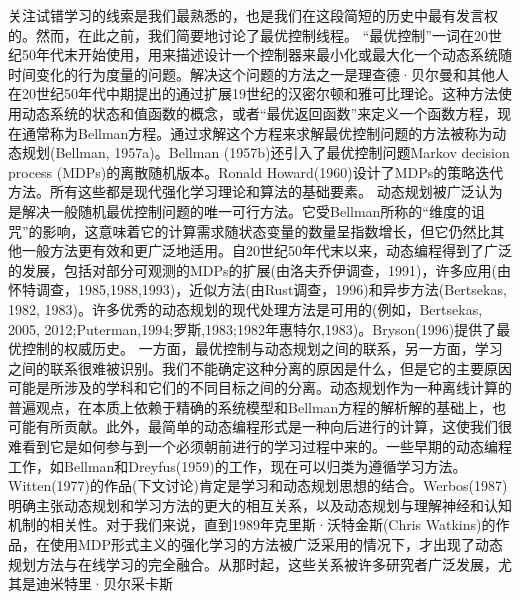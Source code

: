 关注试错学习的线索是我们最熟悉的，也是我们在这段简短的历史中最有发言权的。然而，在此之前，我们简要地讨论了最优控制线程。
“最优控制”一词在20世纪50年代末开始使用，用来描述设计一个控制器来最小化或最大化一个动态系统随时间变化的行为度量的问题。解决这个问题的方法之一是理查德·贝尔曼和其他人在20世纪50年代中期提出的通过扩展19世纪的汉密尔顿和雅可比理论。这种方法使用动态系统的状态和值函数的概念，或者“最优返回函数”来定义一个函数方程，现在通常称为Bellman方程。通过求解这个方程来求解最优控制问题的方法被称为动态规划(Bellman, 1957a)。Bellman (1957b)还引入了最优控制问题Markov decision process (MDPs)的离散随机版本。Ronald Howard(1960)设计了MDPs的策略迭代方法。所有这些都是现代强化学习理论和算法的基础要素。
动态规划被广泛认为是解决一般随机最优控制问题的唯一可行方法。它受Bellman所称的“维度的诅咒”的影响，这意味着它的计算需求随状态变量的数量呈指数增长，但它仍然比其他一般方法更有效和更广泛地适用。自20世纪50年代末以来，动态编程得到了广泛的发展，包括对部分可观测的MDPs的扩展(由洛夫乔伊调查，1991)，许多应用(由怀特调查，1985,1988,1993)，近似方法(由Rust调查，1996)和异步方法(Bertsekas, 1982, 1983)。许多优秀的动态规划的现代处理方法是可用的(例如，Bertsekas, 2005, 2012;Puterman,1994;罗斯,1983;1982年惠特尔,1983)。Bryson(1996)提供了最优控制的权威历史。
一方面，最优控制与动态规划之间的联系，另一方面，学习之间的联系很难被识别。我们不能确定这种分离的原因是什么，但是它的主要原因可能是所涉及的学科和它们的不同目标之间的分离。动态规划作为一种离线计算的普遍观点，在本质上依赖于精确的系统模型和Bellman方程的解析解的基础上，也可能有所贡献。此外，最简单的动态编程形式是一种向后进行的计算，这使我们很难看到它是如何参与到一个必须朝前进行的学习过程中来的。一些早期的动态编程工作，如Bellman和Dreyfus(1959)的工作，现在可以归类为遵循学习方法。Witten(1977)的作品(下文讨论)肯定是学习和动态规划思想的结合。Werbos(1987)明确主张动态规划和学习方法的更大的相互关系，以及动态规划与理解神经和认知机制的相关性。对于我们来说，直到1989年克里斯·沃特金斯(Chris Watkins)的作品，在使用MDP形式主义的强化学习的方法被广泛采用的情况下，才出现了动态规划方法与在线学习的完全融合。从那时起，这些关系被许多研究者广泛发展，尤其是迪米特里·贝尔采卡斯

